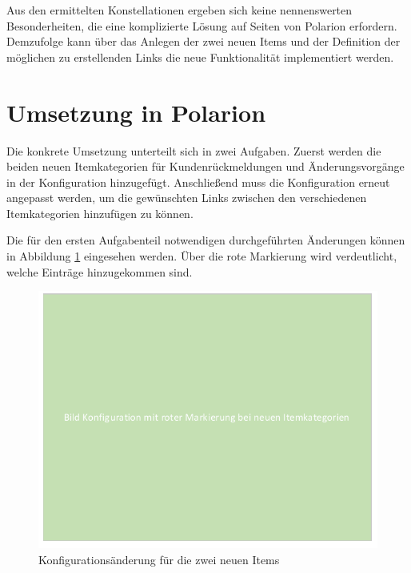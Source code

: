 \documentclass[a4paper,12pt]{report}
\begin{document}
Aus den ermittelten Konstellationen ergeben sich keine nennenswerten Besonderheiten, die eine komplizierte Lösung auf Seiten von Polarion erfordern. Demzufolge kann über das Anlegen der zwei neuen Items und der Definition der möglichen zu erstellenden Links die neue Funktionalität implementiert werden.
\section{Umsetzung in Polarion}
Die konkrete Umsetzung unterteilt sich in zwei Aufgaben. Zuerst werden die beiden neuen Itemkategorien für Kundenrückmeldungen und Änderungsvorgänge in der Konfiguration hinzugefügt. Anschließend muss die Konfiguration erneut angepasst werden, um die gewünschten Links zwischen den verschiedenen Itemkategorien hinzufügen zu können.

Die für den ersten Aufgabenteil notwendigen durchgeführten Änderungen können in Abbildung \ref{new_config_items} eingesehen werden. Über die rote Markierung wird verdeutlicht, welche Einträge hinzugekommen sind.
\begin{figure}[ht]
\centering
\includegraphics[width=1\textwidth]{Images/new_config_items}
\caption[Konfigurationsänderung für die zwei neuen Items]{Konfigurationsänderung für die zwei neuen Items}
\label{new_config_items}
\end{figure}
\end{document}
